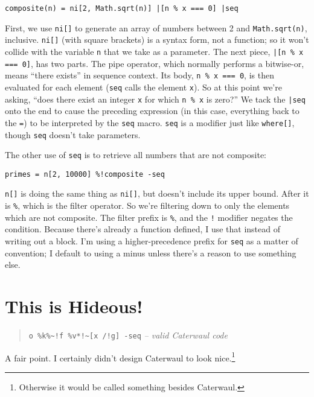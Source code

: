\documentclass{report}
\begin{document}
\begin{verbatim}
composite(n) = ni[2, Math.sqrt(n)] |[n % x === 0] |seq
\end{verbatim}

    First, we use {\tt ni[]} to generate an array of numbers between 2 and {\tt Math.sqrt(n)}, inclusive. {\tt ni[]} (with square brackets) is a syntax form, not a function; so it won't collide
    with the variable {\tt n} that we take as a parameter. The next piece, \verb+|[n % x === 0]+, has two parts. The pipe operator, which normally performs a bitwise-or, means ``there exists''
    in sequence context. Its body, \verb|n % x === 0|, is then evaluated for each element ({\tt seq} calls the element {\tt x}). So at this point we're asking, ``does there exist an integer
    {\tt x} for which {\tt n \% x} is zero?'' We tack the \verb+|seq+ onto the end to cause the preceding expression (in this case, everything back to the {\tt =}) to be interpreted by the
    {\tt seq} macro. {\tt seq} is a modifier just like {\tt where[]}, though {\tt seq} doesn't take parameters.

    The other use of {\tt seq} is to retrieve all numbers that are not composite:

\begin{verbatim}
primes = n[2, 10000] %!composite -seq
\end{verbatim}

    {\tt n[]} is doing the same thing as {\tt ni[]}, but doesn't include its upper bound. After it is {\tt \%}, which is the filter operator. So we're filtering down to only the elements which
    are not composite. The filter prefix is \verb|%|, and the \verb|!| modifier negates the condition. Because there's already a function defined, I use that instead of writing out a block.
    I'm using a higher-precedence prefix for {\tt seq} as a matter of convention; I default to using a minus unless there's a reason to use something else.

\chapter{This is Hideous!}\label{sec:this-is-hideous}
\begin{quote}
\verb|o %k%~!f %v*!~[x /!g] -seq|
\hfill \textit{-- valid Caterwaul code}
\end{quote}

  A fair point. I certainly didn't design Caterwaul to look nice.\footnote{Otherwise it would be called something besides Caterwaul.}
\end{document}
